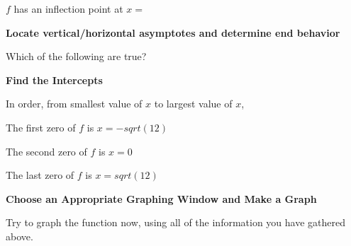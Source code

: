 \documentclass{ximera}
\begin{document}
	\begin{question}
		$f$ has an inflection point at $x=$
	\end{question} 
 
 \textbf{Locate vertical/horizontal asymptotes and determine end behavior}
 
 \begin{question}
 Which of the following are true?
 
 \begin{multipleChoice}
    \end{multipleChoice}
    \end{question}
    
    
  \textbf{Find the Intercepts}
  
 In order, from smallest value of $x$ to largest value of $x$, 
 
 \begin{question}
 	The first zero of $f$ is $x=-sqrt(12)$
 \end{question}
 
  \begin{question}
 	The second zero of $f$ is $x=0$
 \end{question}
 
  \begin{question}
 	The last zero of $f$ is $x=sqrt(12)$
 \end{question}
 
  
  \textbf{Choose an Appropriate Graphing Window and Make a Graph}
  
  Try to graph the function now, using all of the information you have gathered above.  
  
\end{document}
